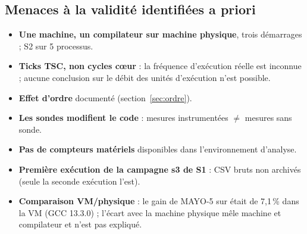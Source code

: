 \subsection{Menaces à la validité identifiées a priori}
\begin{itemize}
\item \textbf{Une machine, un compilateur sur machine physique}, trois démarrages ; S2 sur 5 processus.
\item \textbf{Ticks TSC, non cycles cœur} : la fréquence d'exécution réelle est inconnue ; aucune conclusion sur le débit des unités d'exécution n'est possible.
\item \textbf{Effet d'ordre} documenté (section~\ref{sec:ordre}).
\item \textbf{Les sondes modifient le code} : mesures instrumentées $\ne$ mesures sans sonde.
\item \textbf{Pas de compteurs matériels} disponibles dans l'environnement d'analyse.
\item \textbf{Première exécution de la campagne s3 de S1} : CSV bruts non archivés (seule la seconde exécution l'est).
\item \textbf{Comparaison VM/physique} : le gain de MAYO-5 sur  était de 7,1\,\% dans la VM (GCC 13.3.0) ; l'écart avec la machine physique mêle machine et compilateur et n'est pas expliqué.
\end{itemize}

